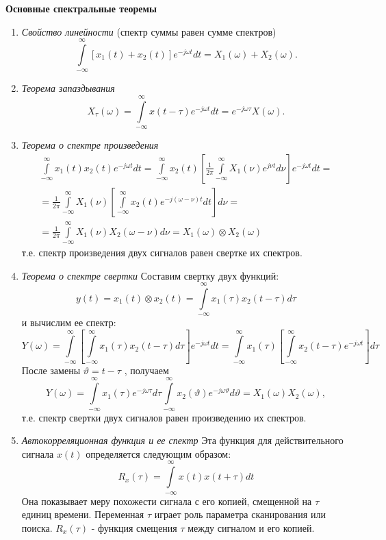 \begin{center}
	{\bf Основные спектральные теоремы}
\end{center}
\begin{enumerate}
	\renewcommand{\labelenumi}{\arabic{enumi})}
	\item {\it Свойство линейности} (спектр суммы равен сумме спектров)
		$$
		\int\limits_{-\infty}^{\infty}\left[x_1(t)+x_2(t)\right]e^{-j\omega t}dt = X_1(\omega)+X_2(\omega).
		$$
	\item {\it Теорема запаздывания}
		$$
		X_\tau(\omega)=\int\limits_{-\infty}^{\infty}x(t-\tau)e^{-j\omega t}dt=e^{-j\omega \tau}X(\omega).
		$$
	\item {\it Теорема о спектре произведения} 
		\begin{eqnarray}
	\int\limits_{-\infty}^{\infty}x_1(t)x_2(t)e^{-j\omega t}dt = \int\limits_{-\infty}^{\infty}x_2(t)\left[\frac{1}{2\pi}\int\limits_{-\infty}^{\infty}X_1(\nu)e^{j\nu t}d\nu \right]e^{-j\omega t}dt  = \\ = \frac{1}{2 \pi} \int\limits_{-\infty}^{\infty} X_1(\nu) \left[\int\limits_{-\infty}^{\infty} x_2(t)e^{-j(\omega -\nu )t}dt\right]d\nu = \\ = \frac{1}{2 \pi} \int\limits_{-\infty}^{\infty} X_1(\nu)X_2(\omega-\nu)d\nu = X_1(\omega) \otimes X_2(\omega)
		\end{eqnarray}
	т.е. спектр произведения двух сигналов равен свертке их спектров.
	\item {\it Теорема о спектре свертки} Составим свертку двух функций:
		$$
		y(t) = x_1(t) \otimes x_2(t) = \int\limits_{-\infty}^{\infty} x_1(\tau)x_2(t-\tau)d\tau
		$$
		и вычислим ее спектр:
		$$
		Y(\omega) = \int\limits_{-\infty}^{\infty}\left[\int\limits_{-\infty}^{\infty}  x_1(\tau)x_2(t - \tau)d\tau \right] e^{-j\omega t}dt = \int\limits_{-\infty}^{\infty}x_1(\tau) \left[ \int\limits_{-\infty}^{\infty} x_2(t-\tau)e^{-j\omega t} \right] d\tau
		$$
		После замены $\vartheta = t - \tau $ , получаем
		$$
		Y(\omega) = \int\limits_{-\infty}^{\infty}x_1(\tau)e^{-j\omega \tau}d\tau \int\limits_{-\infty}^{\infty}x_2(\vartheta)e^{-j\omega \vartheta}d\vartheta = X_1(\omega)X_2(\omega),
		$$
		т.е. спектр свертки двух сигналов равен произведению их спектров.
	\item {\it Автокорреляционная функция и ее спектр} Эта функция для действительного сигнала $x(t)$ определяется следующим образом:
	$$
	R_x(\tau) = \int\limits_{-\infty}^{\infty} x(t)x(t+\tau)dt
	$$
	Она показывает меру похожести сигнала с его копией, смещенной на $\tau$ единиц времени. Переменная $\tau$ играет роль параметра сканирования или поиска. $R_x(\tau)$ - функция смещения $\tau$ между сигналом и его копией.
\end{enumerate}

